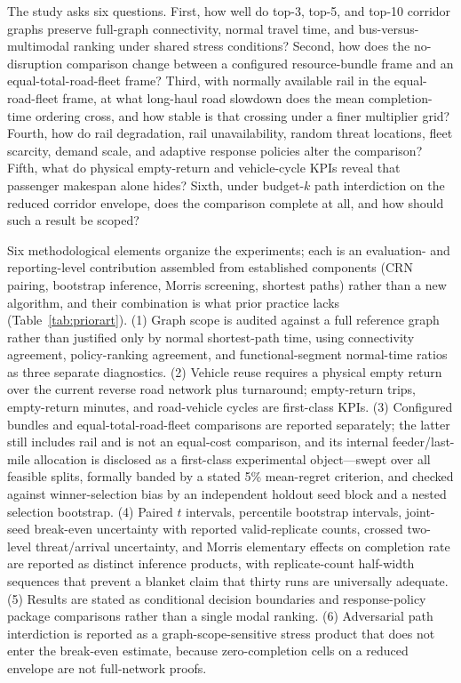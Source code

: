 \documentclass{ieeeaccess}
\begin{document}
The study asks six questions. First, how well do top-3, top-5, and top-10 corridor graphs preserve full-graph connectivity, normal travel time, and bus-versus-multimodal ranking under shared stress conditions? Second, how does the no-disruption comparison change between a configured resource-bundle frame and an equal-total-road-fleet frame? Third, with normally available rail in the equal-road-fleet frame, at what long-haul road slowdown does the mean completion-time ordering cross, and how stable is that crossing under a finer multiplier grid? Fourth, how do rail degradation, rail unavailability, random threat locations, fleet scarcity, demand scale, and adaptive response policies alter the comparison? Fifth, what do physical empty-return and vehicle-cycle KPIs reveal that passenger makespan alone hides? Sixth, under budget-$k$ path interdiction on the reduced corridor envelope, does the comparison complete at all, and how should such a result be scoped?

Six methodological elements organize the experiments; each is an evaluation- and reporting-level contribution assembled from established components (CRN pairing, bootstrap inference, Morris screening, shortest paths) rather than a new algorithm, and their combination is what prior practice lacks (Table~\ref{tab:priorart}). (1) Graph scope is audited against a full reference graph rather than justified only by normal shortest-path time, using connectivity agreement, policy-ranking agreement, and functional-segment normal-time ratios as three separate diagnostics. (2) Vehicle reuse requires a physical empty return over the current reverse road network plus turnaround; empty-return trips, empty-return minutes, and road-vehicle cycles are first-class KPIs. (3) Configured bundles and equal-total-road-fleet comparisons are reported separately; the latter still includes rail and is not an equal-cost comparison, and its internal feeder/last-mile allocation is disclosed as a first-class experimental object---swept over all feasible splits, formally banded by a stated 5\% mean-regret criterion, and checked against winner-selection bias by an independent holdout seed block and a nested selection bootstrap. (4) Paired $t$ intervals, percentile bootstrap intervals, joint-seed break-even uncertainty with reported valid-replicate counts, crossed two-level threat/arrival uncertainty, and Morris elementary effects on completion rate are reported as distinct inference products, with replicate-count half-width sequences that prevent a blanket claim that thirty runs are universally adequate. (5) Results are stated as conditional decision boundaries and response-policy package comparisons rather than a single modal ranking. (6) Adversarial path interdiction is reported as a graph-scope-sensitive stress product that does not enter the break-even estimate, because zero-completion cells on a reduced envelope are not full-network proofs.
\end{document}
